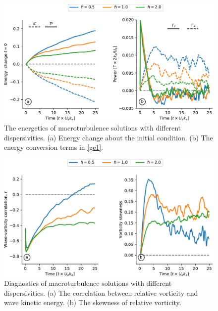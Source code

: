 \documentclass{jfm}
\begin{document}
\begin{figure}
\centering
\includegraphics[width=1.\textwidth]{figs/fig6.pdf}
\caption{The energetics of macroturbulence solutions with different
         dispersivities. (a) Energy change about the initial condition.
         (b) The energy conversion terms in \eqref{ge1}.
        } \label{stats_turb_various}
\end{figure}

\begin{figure}
\centering
\includegraphics[width=1.\textwidth]{figs/fig7.pdf}
\caption{Diagnostics of macroturbulence solutions with different
         dispersivities. (a) The correlation between relative vorticity and
         wave kinetic energy. (b) The skewness of relative vorticity.
        } \label{correlation_skewness}
\end{figure}
\end{document}
